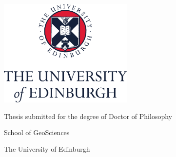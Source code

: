 \begin{titlepage}
\begin{center}

\begin{spacing}{2.5}
{\Huge\textsc{\textbf{\thesistitle{}}}}
\end{spacing}

\vspace{2.0cm}

\includegraphics[width=0.5\textwidth]{img/uoe_logo}

\vspace{2.0cm}

{\LARGE \thesisauthor{}}

\vspace{2cm}

Thesis submitted for the degree of Doctor of Philosophy

School of GeoSciences

The University of Edinburgh

\thesisdate{}

\end{center}
\end{titlepage}

